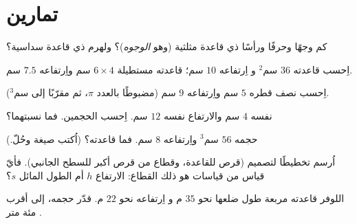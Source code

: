 \section{تمارين}

\begin{exercise}[$\star$]\label{exo:g8:solids:1}
كم وجهًا وحرفًا ورأسًا  ذي قاعدة
مثلثية (وهو \emph{ الوجوه})؟ ولهرم ذي قاعدة سداسية؟
\end{exercise}

\begin{exercise}[$\star$]\label{exo:g8:solids:2}
اِحسب    قاعدته $36$ سم$^2$ و
اِرتفاعه $10$ سم؛   قاعدته مستطيلة
$6 \times 4$ سم واِرتفاعه $7.5$ سم.
\end{exercise}

\begin{exercise}[$\star$]\label{exo:g8:solids:3}
اِحسب   نصف قطره $5$ سم واِرتفاعه $9$ سم
(مضبوطًا بالعدد $\pi$، ثم مقرّبًا إلى سم$^3$).
\end{exercise}

\begin{exercise}[$\star$]\label{exo:g8:solids:4}
   نفسه $4$ سم والارتفاع نفسه
$12$ سم. اِحسب الحجمين. فما نسبتهما؟
\end{exercise}

\begin{exercise}[$\star$]\label{exo:g8:solids:5}
 حجمه $56$ سم$^3$ واِرتفاعه $8$ سم. فما 
قاعدته؟ (اُكتب صيغة  وحُلّ.)
\end{exercise}

\begin{exercise}[$\star$]\label{exo:g8:solids:6}
اُرسم تخطيطًا لتصميم  (قرص للقاعدة، وقطاع من
قرص أكبر للسطح الجانبي). فأيّ قياس من قياسات 
هو  ذلك القطاع: الارتفاع $h$ أم الطول المائل
$s$؟
\end{exercise}

\begin{exercise}[$\star\star$]\label{exo:g8:solids:7}
 اللوفر قاعدته مربعة طول ضلعها نحو $35$ م و
اِرتفاعه نحو $22$ م. قدّر حجمه، إلى أقرب مئة
متر .
\end{exercise}

